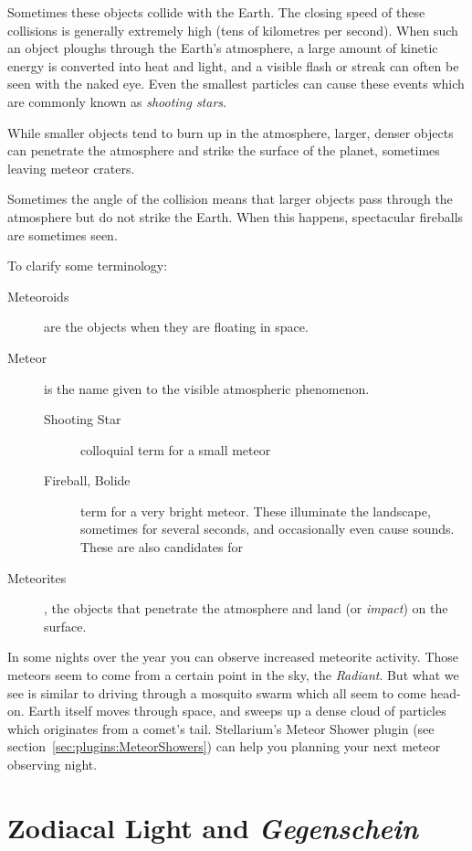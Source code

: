 Sometimes these objects collide with the Earth. The closing speed of
these collisions is generally extremely high (tens of kilometres per
second). When such an object ploughs through the Earth's atmosphere, a
large amount of kinetic energy is converted into heat and light, and a
visible flash or streak can often be seen with the naked eye. Even the
smallest particles can cause these events which are commonly known as
\emph{shooting stars}.

While smaller objects tend to burn up in the atmosphere, larger, denser
objects can penetrate the atmosphere and strike the surface of the
planet, sometimes leaving meteor craters.

Sometimes the angle of the collision means that larger objects pass
through the atmosphere but do not strike the Earth. When this happens,
spectacular fireballs are sometimes seen.

To clarify some terminology:
\begin{description}
\item[Meteoroids]  are the objects when they are floating in space.
\item[Meteor] is the name given to the visible atmospheric phenomenon.
\begin{description}
 \item[Shooting Star] colloquial term for a small meteor
 \item[Fireball, Bolide] term for a very bright meteor. These illuminate the landscape, 
  sometimes for several seconds, and occasionally even cause sounds. These are also candidates for 
\end{description}
\item[Meteorites], the objects that penetrate the
atmosphere and land (or \emph{impact}) on the surface.
\end{description}

In some nights over the year you can observe increased meteorite
activity. Those meteors seem to come from a certain point in the sky,
the \emph{Radiant}. But what we see is similar to driving through a
mosquito swarm which all seem to come head-on. Earth itself moves
through space, and sweeps up a dense cloud of particles which
originates from a comet's tail. Stellarium's Meteor Shower plugin (see
section~\ref{sec:plugins:MeteorShowers}) can help you planning your next
meteor observing night.

\section{Zodiacal Light and \emph{Gegenschein}}
\label{sec:Phenomena:ZodiacalLight}

